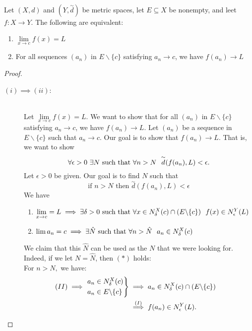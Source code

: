 \begin{theorem} \leavevmode \\
    \label{thm4.2}
    Let $(X,d)$ and $(Y, \overset{\sim}{d})$ be metric spaces, let $E\subseteq X$ be nonempty, and leet $f: X \to Y$. The following are equivalent:
    \begin{enumerate}[$(i)$]
        \item $\lim \limits_{x\to c} f(x) = L$
        \item For all sequences $(a_n)$ in $E \backslash \{c\}$ satisfying $a_n \to c$, we have $f(a_n) \to L$
    \end{enumerate}
\end{theorem}

\begin{proof}
    \begin{description}
        \item[$(i) \implies (ii)$:] \leavevmode \\
        Let $\lim \limits_{x \to c} f(x) = L.$ We want to show that for all $(a_n)$ in $E \backslash \{c\}$ satisfying $a_n \to c$, we have $f(a_n) \to L$. Let $(a_n)$ be a sequence in $E \backslash \{c\}$ such that $a_n \to c$. Our goal is to show that $f(a_n) \to L.$ That is, we want to show
        $$\forall \epsilon > 0 ~\exists N \text{ such that } \forall n > N ~~\overset{\sim}{d}(f(a_n), L) < \epsilon.$$
        Let $\epsilon > 0$ be given. Our goal is to find $N$ such that
        \begin{equation*}
            \text{if $n > N$ then $\overset{\sim}{d}(f(a_n), L) < \epsilon$} \tag{$*$}
        \end{equation*}
        We have
        \begin{enumerate}[$(I)$]
            \item $\lim \limits_{x \to c} = L \implies \exists \delta > 0 \text{ such that } \forall x \in N_{\delta}^{X}(c) \cap (E \backslash \{c\}) ~~f(x) \in N_{\epsilon}^{Y}(L)$
            \item $\lim a_n = c \implies \exists \hat{N} \text{ such that } \forall n > \hat{N} ~~a_n \in N_{\delta}^{X}(c)$
        \end{enumerate}
        We claim that this $\hat{N}$ can be used as the $N$ that we were looking for. Indeed, if we let $N = \hat{N}$, then $(*)$ holds: \\
        For $n > N,$ we have:
        \begin{align*}
            (II) \implies
            \begin{rcases*}
                a_n \in \nbhds{\delta}{X}{c} \\
                a_n \in E \backslash \{c\}
            \end{rcases*}
            &\implies a_n \in \nbhds{\delta}{X}{c} \cap (E \backslash \{c\}) \\
            &\overset{(I)}{\implies} f(a_n) \in \nbhds{\epsilon}{Y}{L}.
        \end{align*} 


\end{description}
\end{proof}
